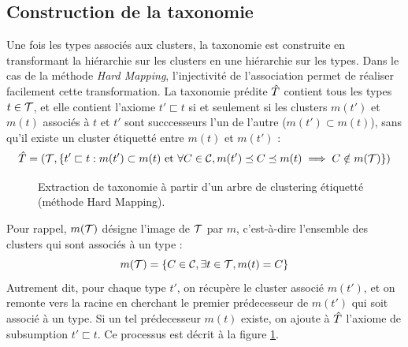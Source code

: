 \subsection{Construction de la taxonomie}
\label{subsec:te-taxconstruction}

Une fois les types associés aux clusters, la taxonomie est construite en transformant la hiérarchie sur les clusters en une hiérarchie sur les types. Dans le cas de la méthode \textit{Hard Mapping}, l'injectivité de l'association permet de réaliser facilement cette transformation. La taxonomie prédite $\Tpred$ contient tous les types $t \in \cal{T}$, et elle contient l'axiome $t' \sqsubset t$ si et seulement si les clusters $m(t')$ et $m(t)$ associés à $t$ et $t'$ sont succcesseurs l'un de l'autre ($m(t') \subset m(t)$), sans qu'il existe un cluster étiquetté entre $m(t)$ et $m(t')$ :
\begin{equation}
    \Tpred = (\cal{T}, \{t' \sqsubset t : m(t') \subset m(t) \text{ et } \forall C \in \cal{C}, m(t') \preceq C \preceq m(t) \implies C \notin m(\cal{T}) \})
    \label{eq:te-extract-tax-from-mapping}
\end{equation}

\begin{figure}[h]
    \centering
    
    \caption[Extraction de taxonomie selon la méthode Hard Mapping]{Extraction de taxonomie à partir d'un arbre de clustering étiquetté (méthode Hard Mapping).}
    \label{fig:te-hm-extraction}
\end{figure}


Pour rappel, $m(\cal{T})$ désigne l'image de $\cal{T}$ par $m$, c'est-à-dire l'ensemble des clusters qui sont associés à un type :
\begin{equation}
    m(\cal{T}) = \{ C \in \cal{C}, \exists t \in \cal{T}, m(t) = C \}
\end{equation}
Autrement dit, pour chaque type $t'$, on récupère le cluster associé $m(t')$, et on remonte vers la racine en cherchant le premier prédecesseur de $m(t')$ qui soit associé à un type. Si un tel prédecesseur $m(t)$ existe, on ajoute à $\Tpred$ l'axiome de subsumption $t' \sqsubset t$. Ce processus est décrit à la figure \ref{fig:te-hm-extraction}.



